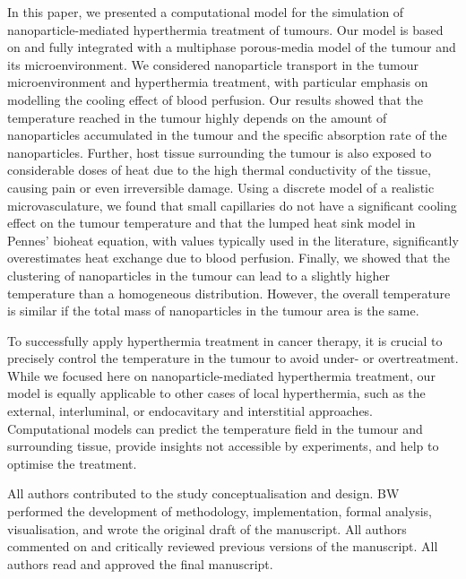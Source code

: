 \documentclass[Times1COL,AMA]{WileyNJDv5} %
\begin{document}
In this paper, we presented a computational model for the simulation of nanoparticle-mediated hyperthermia treatment of tumours.
Our model is based on and fully integrated with a multiphase porous-media model of the tumour and its microenvironment.
We considered nanoparticle transport in the tumour microenvironment and hyperthermia treatment, with particular emphasis on modelling the cooling effect of blood perfusion.
Our results showed that the temperature reached in the tumour highly depends on the amount of nanoparticles accumulated in the tumour and the specific absorption rate of the nanoparticles.
Further, host tissue surrounding the tumour is also exposed to considerable doses of heat due to the high thermal conductivity of the tissue, causing pain or even irreversible damage.
Using a discrete model of a realistic microvasculature, we found that small capillaries do not have a significant cooling effect on the tumour temperature and that the lumped heat sink model in Pennes' bioheat equation, with values typically used in the literature, significantly overestimates heat exchange due to blood perfusion.
Finally, we showed that the clustering of nanoparticles in the tumour can lead to a slightly higher temperature than a homogeneous distribution.
However, the overall temperature is similar if the total mass of nanoparticles in the tumour area is the same.

To successfully apply hyperthermia treatment in cancer therapy, it is crucial to precisely control the temperature in the tumour to avoid under- or overtreatment.
While we focused here on nanoparticle-mediated hyperthermia treatment, our model is equally applicable to other cases of local hyperthermia, such as the external, interluminal, or endocavitary and interstitial approaches.
Computational models can predict the temperature field in the tumour and surrounding tissue, provide insights not accessible by experiments, and help to optimise the treatment.



{}

All authors contributed to the study conceptualisation and design.
BW performed the development of methodology, implementation, formal analysis, visualisation, and wrote the original draft of the manuscript.
All authors commented on and critically reviewed previous versions of the manuscript.
All authors read and approved the final manuscript.

\end{document}
